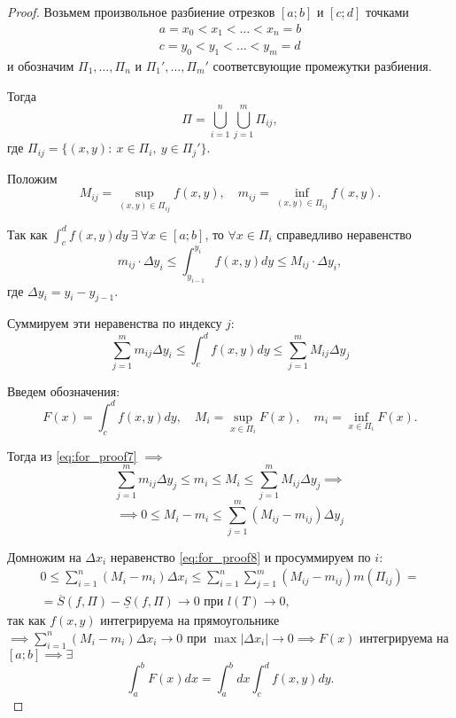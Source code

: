 \begin{proof}
    Возьмем произвольное разбиение отрезков $ [a;b] $ и $ [c;d] $ точками
    \[
        \begin{array}{l}
            a = x_0 < x_1 < \ldots < x_n = b \\
            c = y_0 < y_1 < \ldots < y_m = d
        \end{array}
    \]
    и обозначим $ \Pi_1,\ldots,\Pi_n $ и $ \Pi_1',\ldots,\Pi_m' $ соответсвующие промежутки разбиения.

    Тогда
    \[
        \Pi = \bigcup\limits_{i=1}^{n}\bigcup\limits_{j=1}^{m}\Pi_{ij},
    \]
    где $ \Pi_{ij} = \big\{(x,y): \ x \in \Pi_i, \ y \in \Pi_j'\big\} $.

    Положим
    \[
        M_{ij} = \underset{(x,y)\in\Pi_{ij}}{\sup}f(x,y), \quad m_{ij} = \underset{(x,y)\in\Pi_{ij}}{\inf}f(x,y).
    \]

    Так как $ \int_{c}^{d}f(x,y)dy \ \exists \ \forall x \in [a;b] $, то $ \forall x \in \Pi_i $ справедливо неравенство
    \[
        m_{ij}\cdot\Delta y_i \leqslant \int_{y_{i-1}}^{y_i}f(x,y)dy \leqslant M_{ij}\cdot\Delta y_i,
    \]
    где $ \Delta y_i = y_i - y_{j-1} $.

    Суммируем эти неравенства по индексу $ j $:
    \begin{equation}\label{eq:for_proof7}
        \sum_{j=1}^{m}m_{ij}\Delta y_i \leqslant \int_{c}^{d}f(x,y)dy \leqslant \sum_{j=1}^{m}M_{ij}\Delta y_j
    \end{equation}

    Введем обозначения:
    \[
        F(x) = \int_{c}^{d}f(x,y)dy, \quad M_i = \underset{x\in\Pi_i}{\sup}F(x), \quad m_i = \underset{x\in\Pi_i}{\inf}F(x).
    \]

    Тогда из \ref{eq:for_proof7} $ \implies $
    \[
        \sum_{j=1}^{m}m_{ij}\Delta y_j \leqslant m_i \leqslant M_i \leqslant \sum_{j=1}^{m}M_{ij}\Delta y_j \implies
    \]
    \begin{equation}\label{eq:for_proof8}
        \implies 0 \leqslant M_i - m_i \leqslant \sum_{j=1}^{m}(M_{ij} - m_{ij})\Delta y_j
    \end{equation}

    Домножим на $ \Delta x_i $ неравенство \ref{eq:for_proof8} и просуммируем по $ i $:
    \begin{multline*}
        0 \leqslant \sum_{i=1}^{n}(M_i - m_i)\Delta x_i \leqslant \sum_{i=1}^{n}\sum_{j=1}^{m}(M_{ij} - m_{ij})m(\Pi_{ij}) = \\
        = \overline{S}(f,\Pi) - \underline{S}(f,\Pi) \rightarrow 0 \text{ при }l(T)\rightarrow 0,
    \end{multline*}
    так как $ f(x,y) $ интегрируема на прямоугольнике $ \implies \sum_{i=1}^{n}(M_i - m_i)\Delta x_i \rightarrow 0 $ при $ \max|\Delta x_i| \rightarrow 0 \implies F(x) $ интегрируема на $ [a;b] \implies \exists $
    \[
        \int_{a}^{b}F(x)dx = \int_{a}^{b}dx \int_{c}^{d}f(x,y)dy.
    \]


\end{proof}
